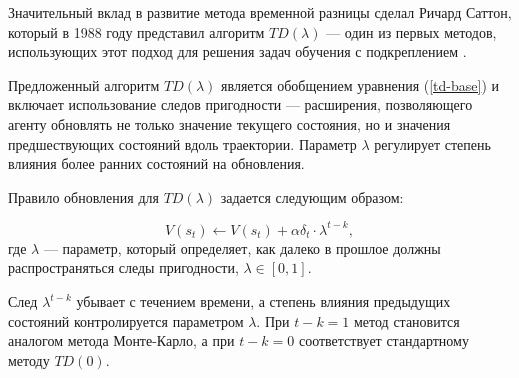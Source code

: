 Значительный вклад в развитие метода временной разницы сделал Ричард Саттон, который в 1988 году представил алгоритм $TD(\lambda)$ --- один из первых методов, использующих этот подход для решения задач обучения с подкреплением \cite{td-first-improvement}.

Предложенный алгоритм $TD(\lambda)$ является обобщением уравнения (\ref{td-base}) и включает использование следов пригодности --- расширения, позволяющего агенту обновлять не только значение текущего состояния, но и значения предшествующих состояний вдоль траектории. Параметр $\lambda$ регулирует степень влияния более ранних состояний на обновления.

Правило обновления для $TD(\lambda)$ задается следующим образом:

\begin{equation}\label{td-lambda}
    V(s_t) \leftarrow V(s_t) + \alpha \delta_t \cdot \lambda^{t - k},
\end{equation}
где $\lambda$ --- параметр, который определяет, как далеко в прошлое должны распространяться следы пригодности, $\lambda \in [0, 1]$.

След $\lambda^{t-k}$ убывает с течением времени, а степень влияния предыдущих состояний контролируется параметром $\lambda$. При $t-k = 1$ метод становится аналогом метода Монте-Карло, а при $t-k = 0$ соответствует стандартному методу $TD(0)$.

